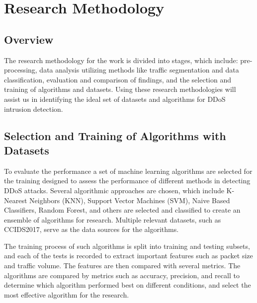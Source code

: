\documentclass[a4paper, 12pt]{article}
\begin{document}
\clearpage

\section{Research Methodology}

\subsection{Overview}
The research methodology for the work is divided into stages, which include: pre-processing, data analysis utilizing methods like traffic segmentation and data classification, evaluation and comparison of findings, and the selection and training of algorithms and datasets. Using these research methodologies will assist us in identifying the ideal set of datasets and algorithms for DDoS intrusion detection.


\subsection{ Selection and Training of Algorithms with Datasets}

To evaluate the performance a set of machine learning algorithms are selected for the training designed to assess the performance of different methods in detecting DDoS attacks. Several algorithmic approaches are chosen, which include K-Nearest Neighbors (KNN), Support Vector Machines (SVM), Naive Based Classifiers, Random Forest, and others are selected and classified to create an ensemble of algorithms for research. Multiple relevant datasets, such as CCIDS2017, serve as the data sources for the algorithms. 

The training process of such algorithms is split into training and testing subsets, and each of the tests is recorded to extract important features such as packet size and traffic volume. The features are then compared with several metrics. The algorithms are compared by metrics such as accuracy, precision, and recall to determine which algorithm performed best on different conditions, and select the most effective algorithm for the research.
\end{document}
